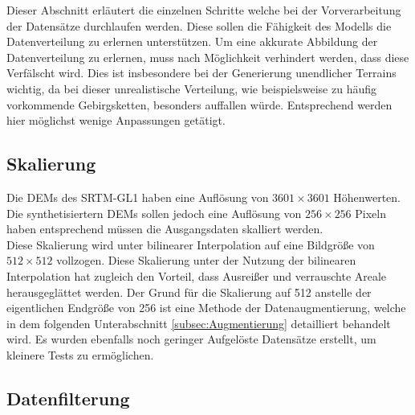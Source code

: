 Dieser Abschnitt erläutert die einzelnen Schritte welche bei der Vorverarbeitung der Datensätze durchlaufen werden. Diese sollen die Fähigkeit des Modells die Datenverteilung zu erlernen unterstützen. Um eine akkurate Abbildung der Datenverteilung zu erlernen, muss nach Möglichkeit verhindert werden, dass diese Verfälscht wird. Dies ist insbesondere bei der Generierung unendlicher Terrains wichtig, da bei dieser unrealistische Verteilung, wie beispielsweise zu häufig vorkommende Gebirgsketten, besonders auffallen würde. Entsprechend werden hier möglichst wenige Anpassungen getätigt.


\subsection{Skalierung}

Die DEMs des SRTM-GL1 haben eine Auflösung von $3601\times3601$ Höhenwerten. Die synthetisiertern DEMs sollen jedoch eine Auflösung von $256\times256$ Pixeln haben entsprechend müssen die Ausgangsdaten skalliert werden. \\ 
Diese Skalierung wird unter bilinearer Interpolation auf eine Bildgröße von $512\times512$ vollzogen. Diese Skalierung unter der Nutzung der bilinearen Interpolation hat zugleich den Vorteil, dass Ausreißer und verrauschte Areale herausgeglättet werden. Der Grund für die Skalierung auf 512 anstelle der eigentlichen Endgröße von 256 ist eine Methode der Datenaugmentierung, welche in dem folgenden Unterabschnitt \ref{subsec:Augmentierung} detailliert behandelt wird. 
Es wurden ebenfalls noch geringer Aufgelöste Datensätze erstellt, um kleinere Tests zu ermöglichen. 

\subsection{Datenfilterung}

